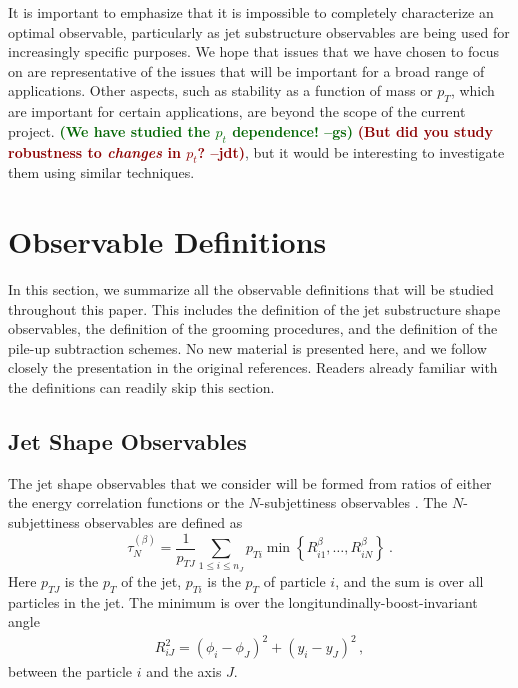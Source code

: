 \documentclass[11pt,letterpaper]{article}
\newcommand{\Nsub}[2]{\tau_{#1}^{(#2)}}
\newcommand{\jdt}[1]{\textbf{\textcolor{darkred}{(#1 --jdt)}}}
\newcommand{\gs}[1]{\textbf{\textcolor{darkgreen}{(#1 --gs)}}}
\begin{document}
It is important to emphasize that it is impossible to completely
characterize an optimal observable, particularly as jet substructure
observables are being used for increasingly specific
purposes.
%
We hope that issues that we have chosen to focus on
are representative of the issues that will be important for a broad
range of applications.
%
Other aspects, such as stability as a function
of mass or $p_T$, which are important for certain applications, are
beyond the scope of the current project. \gs{We have studied the $p_t$
  dependence!} \jdt{But did you study robustness to \emph{changes} in $p_t$?},
  but it would be interesting to investigate them
using similar techniques.


\section{Observable Definitions}\label{sec:obs_def}

In this section, we summarize all the observable definitions that will be studied throughout this paper.
%
This includes the definition of the jet substructure shape observables, the definition of the grooming procedures, and the definition of the pile-up subtraction schemes.
%
No new material is presented here, and we follow closely the presentation in the original references.
%
Readers already familiar with the definitions can readily skip this section.



\subsection{Jet Shape Observables}\label{sec:shape_def}

The jet shape observables that we consider will be formed from ratios of either the energy correlation functions \cite{Larkoski:2013eya,Moult:2016cvt} or the $N$-subjettiness observables \cite{Thaler:2010tr,Thaler:2011gf}.
%
The $N$-subjettiness observables are defined as \cite{Stewart:2010tn,Thaler:2010tr,Thaler:2011gf}
%
\begin{equation}\label{eq:nsubdef}
\Nsub{N}{\beta} = \frac{1}{p_{TJ}}\sum_{1\leq i \leq n_J} p_{Ti}\min\left\{
R_{i1}^\beta,\dotsc,R_{iN}^\beta
\right\} \ .
\end{equation}
%
Here $p_{TJ}$ is the $p_T$ of the jet, $p_{Ti}$ is the $p_T$ of particle $i$, and the sum is over all particles in the jet.
%
The minimum is over the longitundinally-boost-invariant angle
%
\begin{align}\label{eq:ptratio}  
R_{iJ}^2 = (\phi_i-\phi_J)^2+(y_i-y_J)^2\,,
\end{align}
%
between the particle $i$ and the axis $J$.
\end{document}
